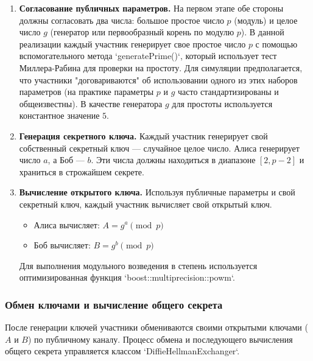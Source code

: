 \begin{enumerate}
    \item \textbf{Согласование публичных параметров.} На первом этапе обе стороны должны согласовать два числа: большое простое число $p$ (модуль) и целое число $g$ (генератор или первообразный корень по модулю $p$). В данной реализации каждый участник генерирует свое простое число $p$ с помощью вспомогательного метода `generatePrime()`, который использует тест Миллера-Рабина для проверки на простоту. Для симуляции предполагается, что участники "договариваются" об использовании одного из этих наборов параметров (на практике параметры $p$ и $g$ часто стандартизированы и общеизвестны). В качестве генератора $g$ для простоты используется константное значение $5$.

    \item \textbf{Генерация секретного ключа.} Каждый участник генерирует свой собственный секретный ключ — случайное целое число. Алиса генерирует число $a$, а Боб — $b$. Эти числа должны находиться в диапазоне $[2, p-2]$ и храниться в строжайшем секрете.
    
    \item \textbf{Вычисление открытого ключа.} Используя публичные параметры и свой секретный ключ, каждый участник вычисляет свой открытый ключ.
    \begin{itemize}
        \item Алиса вычисляет: $A = g^a \pmod{p}$
        \item Боб вычисляет: $B = g^b \pmod{p}$
    \end{itemize}
    Для выполнения модульного возведения в степень используется оптимизированная функция `boost::multiprecision::powm`.
\end{enumerate}



\subsubsection{Обмен ключами и вычисление общего секрета}
После генерации ключей участники обмениваются своими открытыми ключами ($A$ и $B$) по публичному каналу. Процесс обмена и последующего вычисления общего секрета управляется классом `DiffieHellmanExchanger`.


